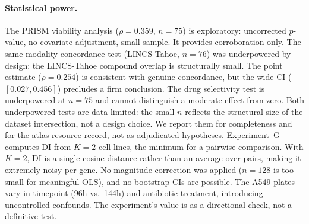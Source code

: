 \documentclass[11pt]{article}
\begin{document}
\paragraph{Statistical power.}
The PRISM viability analysis ($\rho = 0.359$, $n = 75$) is exploratory:
uncorrected $p$-value, no covariate adjustment, small sample.  It
provides corroboration only.
The same-modality concordance test (LINCS-Tahoe, $n = 76$) was
underpowered by design: the LINCS-Tahoe compound overlap is
structurally small.  The point estimate ($\rho = 0.254$) is consistent
with genuine concordance, but the wide CI ($[0.027, 0.456]$) precludes a
firm conclusion.
The drug selectivity test is underpowered at $n = 75$ and cannot
distinguish a moderate effect from zero.  Both underpowered tests are
data-limited: the small $n$ reflects the structural size of the dataset
intersection, not a design choice.  We report them for completeness and
for the atlas resource record, not as adjudicated hypotheses.
Experiment~G computes DI from $K = 2$ cell lines, the minimum for a
pairwise comparison.  With $K = 2$, DI is a single cosine distance
rather than an average over pairs, making it extremely noisy per gene.
No magnitude correction was applied ($n = 128$ is too small for
meaningful OLS), and no bootstrap CIs are possible.  The A549 plates
vary in timepoint (96h vs.\ 144h) and antibiotic treatment, introducing
uncontrolled confounds.  The experiment's value is as a directional
check, not a definitive test.
\end{document}
